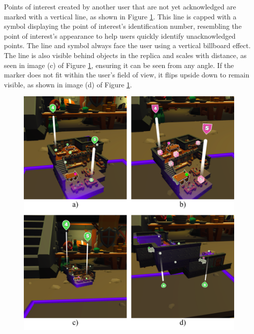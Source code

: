         Points of interest created by another user that are not yet acknowledged are marked with a vertical line, as shown in Figure \ref{fig:poi_marker}. This line is capped with a symbol displaying the point of interest's identification number, resembling the point of interest's appearance to help users quickly identify unacknowledged points. The line and symbol always face the user using a vertical billboard effect. The line is also visible behind objects in the replica and scales with distance, as seen in image (c) of Figure \ref{fig:poi_marker}, ensuring it can be seen from any angle. If the marker does not fit within the user's field of view, it flips upside down to remain visible, as shown in image (d) of Figure \ref{fig:poi_marker}.

       \begin{figure}[h!]
            \centering
            \includegraphics[width=1\textwidth]{figures/poi_marker.png}
            \label{fig:poi_marker}
        \end{figure}
        
